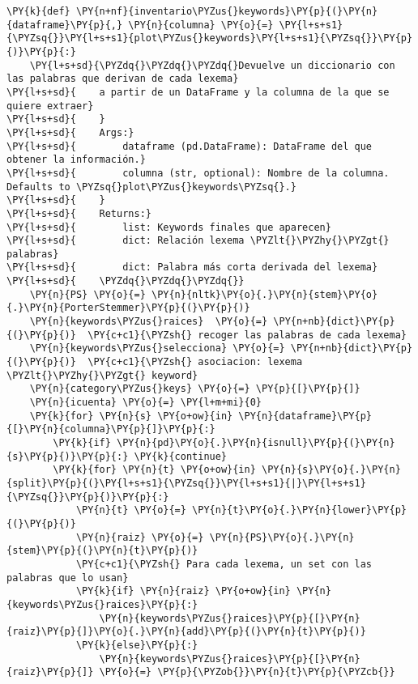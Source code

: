     \begin{tcolorbox}[breakable, size=fbox, boxrule=1pt, pad at break*=1mm,colback=cellbackground, colframe=cellborder]
\begin{Verbatim}[commandchars=\\\{\}]
\PY{k}{def} \PY{n+nf}{inventario\PYZus{}keywords}\PY{p}{(}\PY{n}{dataframe}\PY{p}{,} \PY{n}{columna} \PY{o}{=} \PY{l+s+s1}{\PYZsq{}}\PY{l+s+s1}{plot\PYZus{}keywords}\PY{l+s+s1}{\PYZsq{}}\PY{p}{)}\PY{p}{:}
    \PY{l+s+sd}{\PYZdq{}\PYZdq{}\PYZdq{}Devuelve un diccionario con las palabras que derivan de cada lexema}
\PY{l+s+sd}{    a partir de un DataFrame y la columna de la que se quiere extraer}
\PY{l+s+sd}{    }
\PY{l+s+sd}{    Args:}
\PY{l+s+sd}{        dataframe (pd.DataFrame): DataFrame del que obtener la información.}
\PY{l+s+sd}{        columna (str, optional): Nombre de la columna. Defaults to \PYZsq{}plot\PYZus{}keywords\PYZsq{}.}
\PY{l+s+sd}{    }
\PY{l+s+sd}{    Returns:}
\PY{l+s+sd}{        list: Keywords finales que aparecen}
\PY{l+s+sd}{        dict: Relación lexema \PYZlt{}\PYZhy{}\PYZgt{} palabras}
\PY{l+s+sd}{        dict: Palabra más corta derivada del lexema}
\PY{l+s+sd}{    \PYZdq{}\PYZdq{}\PYZdq{}}
    \PY{n}{PS} \PY{o}{=} \PY{n}{nltk}\PY{o}{.}\PY{n}{stem}\PY{o}{.}\PY{n}{PorterStemmer}\PY{p}{(}\PY{p}{)}
    \PY{n}{keywords\PYZus{}raices}  \PY{o}{=} \PY{n+nb}{dict}\PY{p}{(}\PY{p}{)}  \PY{c+c1}{\PYZsh{} recoger las palabras de cada lexema}
    \PY{n}{keywords\PYZus{}selecciona} \PY{o}{=} \PY{n+nb}{dict}\PY{p}{(}\PY{p}{)}  \PY{c+c1}{\PYZsh{} asociacion: lexema \PYZlt{}\PYZhy{}\PYZgt{} keyword}
    \PY{n}{category\PYZus{}keys} \PY{o}{=} \PY{p}{[}\PY{p}{]}
    \PY{n}{icuenta} \PY{o}{=} \PY{l+m+mi}{0}
    \PY{k}{for} \PY{n}{s} \PY{o+ow}{in} \PY{n}{dataframe}\PY{p}{[}\PY{n}{columna}\PY{p}{]}\PY{p}{:}
        \PY{k}{if} \PY{n}{pd}\PY{o}{.}\PY{n}{isnull}\PY{p}{(}\PY{n}{s}\PY{p}{)}\PY{p}{:} \PY{k}{continue}
        \PY{k}{for} \PY{n}{t} \PY{o+ow}{in} \PY{n}{s}\PY{o}{.}\PY{n}{split}\PY{p}{(}\PY{l+s+s1}{\PYZsq{}}\PY{l+s+s1}{|}\PY{l+s+s1}{\PYZsq{}}\PY{p}{)}\PY{p}{:}
            \PY{n}{t} \PY{o}{=} \PY{n}{t}\PY{o}{.}\PY{n}{lower}\PY{p}{(}\PY{p}{)}
            \PY{n}{raiz} \PY{o}{=} \PY{n}{PS}\PY{o}{.}\PY{n}{stem}\PY{p}{(}\PY{n}{t}\PY{p}{)}
            \PY{c+c1}{\PYZsh{} Para cada lexema, un set con las palabras que lo usan}
            \PY{k}{if} \PY{n}{raiz} \PY{o+ow}{in} \PY{n}{keywords\PYZus{}raices}\PY{p}{:}                
                \PY{n}{keywords\PYZus{}raices}\PY{p}{[}\PY{n}{raiz}\PY{p}{]}\PY{o}{.}\PY{n}{add}\PY{p}{(}\PY{n}{t}\PY{p}{)}
            \PY{k}{else}\PY{p}{:}
                \PY{n}{keywords\PYZus{}raices}\PY{p}{[}\PY{n}{raiz}\PY{p}{]} \PY{o}{=} \PY{p}{\PYZob{}}\PY{n}{t}\PY{p}{\PYZcb{}}
    

\end{Verbatim}
\end{tcolorbox}
